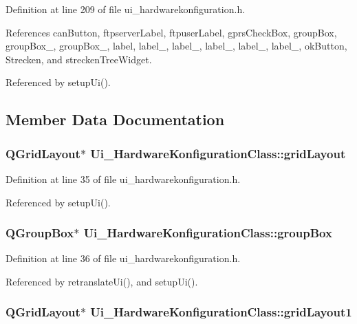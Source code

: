 Definition at line 209 of file ui\_\-hardwarekonfiguration.h.

References canButton, ftpserverLabel, ftpuserLabel, gprsCheckBox, groupBox, groupBox\_, groupBox\_, label, label\_, label\_, label\_, label\_, label\_, okButton, Strecken, and streckenTreeWidget.

Referenced by setupUi().

\subsection{Member Data Documentation}
\hypertarget{class_ui___hardware_konfiguration_class_f77589838837011c6f5963606e294811}{
\subsubsection[gridLayout]{\setlength{\rightskip}{0pt plus 5cm}QGridLayout$\ast$ {\bf Ui\_\-HardwareKonfigurationClass::gridLayout}}}
\label{class_ui___hardware_konfiguration_class_f77589838837011c6f5963606e294811}




Definition at line 35 of file ui\_\-hardwarekonfiguration.h.

Referenced by setupUi().\hypertarget{class_ui___hardware_konfiguration_class_b2b7603199a9bcd3eee88a1bc21cfce3}{
\subsubsection[groupBox]{\setlength{\rightskip}{0pt plus 5cm}QGroupBox$\ast$ {\bf Ui\_\-HardwareKonfigurationClass::groupBox}}}
\label{class_ui___hardware_konfiguration_class_b2b7603199a9bcd3eee88a1bc21cfce3}




Definition at line 36 of file ui\_\-hardwarekonfiguration.h.

Referenced by retranslateUi(), and setupUi().\hypertarget{class_ui___hardware_konfiguration_class_1e1dc8c73f659958294e814098429c48}{
\subsubsection[gridLayout1]{\setlength{\rightskip}{0pt plus 5cm}QGridLayout$\ast$ {\bf Ui\_\-HardwareKonfigurationClass::gridLayout1}}}
\label{class_ui___hardware_konfiguration_class_1e1dc8c73f659958294e814098429c48}




